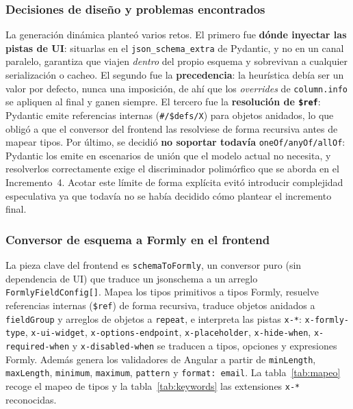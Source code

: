 \subsubsection{Decisiones de diseño y problemas encontrados}
La generación dinámica planteó varios retos. 
El primero fue \textbf{dónde inyectar las pistas de UI}: situarlas en el
\texttt{json\_schema\_extra} de Pydantic, y no en un canal paralelo, garantiza
que viajen \emph{dentro} del propio esquema y sobrevivan a cualquier
serialización o cacheo. El segundo fue la \textbf{precedencia}: la heurística
debía ser un valor por defecto, nunca una imposición, de ahí que los
\emph{overrides} de \texttt{column.info} se apliquen al final y ganen siempre.
El tercero fue la \textbf{resolución de \texttt{\$ref}}: Pydantic emite
referencias internas (\texttt{\#/\$defs/X}) para objetos anidados, lo que
obligó a que el conversor del frontend las resolviese de forma recursiva antes
de mapear tipos. Por último, se decidió \textbf{no soportar todavía}
\texttt{oneOf/anyOf/allOf}: Pydantic los emite en escenarios de unión que el
modelo actual no necesita, y resolverlos correctamente exige el discriminador
polimórfico que se aborda en el Incremento~4. Acotar este límite de forma
explícita evitó introducir complejidad especulativa ya que todavía no se había
decidido cómo plantear el incremento final.

\subsubsection{Conversor de esquema a Formly en el frontend}
La pieza clave del frontend es \texttt{schemaToFormly}, un conversor puro (sin
dependencia de UI) que traduce un \gls{jsonschema} a un arreglo
\texttt{FormlyFieldConfig[]}. Mapea los tipos primitivos a tipos Formly,
resuelve referencias internas (\texttt{\$ref}) de forma recursiva, traduce
objetos anidados a \texttt{field\allowbreak Group} y arreglos de objetos a \texttt{repeat},
e interpreta las pistas \texttt{x-*}: \texttt{x-\allowbreak formly-\allowbreak type},
\texttt{x-\allowbreak ui-\allowbreak widget}, \texttt{x-\allowbreak options-\allowbreak endpoint}, \texttt{x-placeholder},
\texttt{x-hide-when}, \texttt{x-required-when} y \texttt{x-disabled-when} se
traducen a tipos, opciones y expresiones Formly. Además genera los validadores
de Angular a partir de \texttt{minLength}, \texttt{maxLength},
\texttt{minimum}, \texttt{maximum}, \texttt{pattern} y \texttt{format: email}.
La tabla~\ref{tab:mapeo} recoge el mapeo de tipos y la
tabla~\ref{tab:keywords} las extensiones \texttt{x-*} reconocidas.

